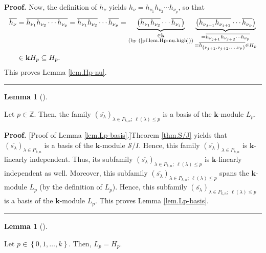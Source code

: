 \documentclass[numbers=enddot,12pt,final,onecolumn,notitlepage]{scrartcl}%
\theoremstyle{definition}
\newtheorem{lem}[theo]{Lemma}
\newenvironment{lemma}[1][]
{\begin{lem}[#1]\begin{leftbar}}
{\end{leftbar}\end{lem}}
\newenvironment{proof}[1][Proof]{\noindent\textbf{#1.} }{\ \rule{0.5em}{0.5em}}
\begin{document}
\begin{proof}
Now, the definition of $h_{\nu}$ yields $h_{\nu}=h_{\nu_{1}}h_{\nu_{2}}\cdots
h_{\nu_{p}}$, so that%
\begin{align*}
\overline{h_{\nu}}  &  =\overline{h_{\nu_{1}}h_{\nu_{2}}\cdots h_{\nu_{p}}%
}=\overline{h_{\nu_{1}}}\overline{h_{\nu_{2}}}\cdots\overline{h_{\nu_{p}}%
}=\underbrace{\left(  \overline{h_{\nu_{1}}}\overline{h_{\nu_{2}}}%
\cdots\overline{h_{\nu_{j}}}\right)  }_{\substack{\in\mathbf{k}\\\text{(by
(\ref{pf.lem.Hp-nu.high}))}}}\underbrace{\left(  \overline{h_{\nu_{j+1}}%
}\overline{h_{\nu_{j+2}}}\cdots\overline{h_{\nu_{p}}}\right)  }%
_{\substack{=\overline{h_{\nu_{j+1}}h_{\nu_{j+2}}\cdots h_{\nu_{p}}%
}\\=\overline{h_{\left(  \nu_{j+1},\nu_{j+2},\ldots,\nu_{p}\right)  }}\in
H_{p}}}\\
&  \in\mathbf{k}H_{p}\subseteq H_{p}.
\end{align*}
This proves Lemma \ref{lem.Hp-nu}.
\end{proof}

\begin{lemma}
\label{lem.Lp-basis}Let $p\in\mathbb{Z}$. Then, the family $\left(
\overline{s_{\lambda}}\right)  _{\lambda\in P_{k,n};\ \ell\left(
\lambda\right)  \leq p}$ is a basis of the $\mathbf{k}$-module $L_{p}$.
\end{lemma}

\begin{proof}
[Proof of Lemma \ref{lem.Lp-basis}.]Theorem \ref{thm.S/J} yields that $\left(
\overline{s_{\lambda}}\right)  _{\lambda\in P_{k,n}}$ is a basis of the
$\mathbf{k}$-module $\mathcal{S}/I$. Hence, this family $\left(
\overline{s_{\lambda}}\right)  _{\lambda\in P_{k,n}}$ is $\mathbf{k}$-linearly
independent. Thus, its subfamily $\left(  \overline{s_{\lambda}}\right)
_{\lambda\in P_{k,n};\ \ell\left(  \lambda\right)  \leq p}$ is $\mathbf{k}%
$-linearly independent as well. Moreover, this subfamily $\left(
\overline{s_{\lambda}}\right)  _{\lambda\in P_{k,n};\ \ell\left(
\lambda\right)  \leq p}$ spans the $\mathbf{k}$-module $L_{p}$ (by the
definition of $L_{p}$). Hence, this subfamily $\left(  \overline{s_{\lambda}%
}\right)  _{\lambda\in P_{k,n};\ \ell\left(  \lambda\right)  \leq p}$ is a
basis of the $\mathbf{k}$-module $L_{p}$. This proves Lemma \ref{lem.Lp-basis}.
\end{proof}

\begin{lemma}
\label{lem.Lp=Hp.restr}Let $p\in\left\{  0,1,\ldots,k\right\}  $. Then,
$L_{p}=H_{p}$.
\end{lemma}
\end{document}
